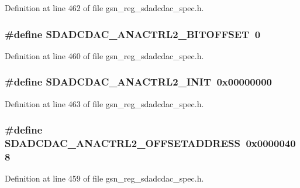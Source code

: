 Definition at line 462 of file gsn\_\-reg\_\-sdadcdac\_\-spec.h.

\hypertarget{a00569_a6cf441d7e351625b4d22adf9f46a032b}{
\subsubsection[{SDADCDAC\_\-ANACTRL2\_\-BITOFFSET}]{\setlength{\rightskip}{0pt plus 5cm}\#define SDADCDAC\_\-ANACTRL2\_\-BITOFFSET~0}}
\label{a00569_a6cf441d7e351625b4d22adf9f46a032b}


Definition at line 460 of file gsn\_\-reg\_\-sdadcdac\_\-spec.h.

\hypertarget{a00569_a9a738e41ecd6bfd2568003048a353337}{
\subsubsection[{SDADCDAC\_\-ANACTRL2\_\-INIT}]{\setlength{\rightskip}{0pt plus 5cm}\#define SDADCDAC\_\-ANACTRL2\_\-INIT~0x00000000}}
\label{a00569_a9a738e41ecd6bfd2568003048a353337}


Definition at line 463 of file gsn\_\-reg\_\-sdadcdac\_\-spec.h.

\hypertarget{a00569_afd7e82b36f1a5e2ab52ac8cdd7dec81c}{
\subsubsection[{SDADCDAC\_\-ANACTRL2\_\-OFFSETADDRESS}]{\setlength{\rightskip}{0pt plus 5cm}\#define SDADCDAC\_\-ANACTRL2\_\-OFFSETADDRESS~0x00000408}}
\label{a00569_afd7e82b36f1a5e2ab52ac8cdd7dec81c}


Definition at line 459 of file gsn\_\-reg\_\-sdadcdac\_\-spec.h.

